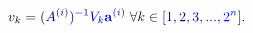 \documentclass[12pt]{article}
\begin{document}
\makeatletter
\renewcommand*{\@textcolor}[3]{%
  \protect\leavevmode
  \begingroup
    \color#1{#2}#3%
  \endgroup
}
\makeatother
\begin{displaymath}
\mathcolor[RGB]{0,0,15}{v} _ { \mathcolor[RGB]{0,0,30}{k} } \mathcolor[RGB]{0,0,45}{=} \mathcolor[RGB]{0,0,60}{(} \mathcolor[RGB]{0,0,75}{A} ^ { \mathcolor[RGB]{0,0,90}{(} \mathcolor[RGB]{0,0,105}{i} \mathcolor[RGB]{0,0,120}{)} } \mathcolor[RGB]{0,0,135}{)} ^ { \mathcolor[RGB]{0,0,150}{-} \mathcolor[RGB]{0,0,165}{1} } \mathcolor[RGB]{0,0,180}{V} _ { \mathcolor[RGB]{0,0,195}{k} } { \mathcolor[RGB]{0,0,210}{\bf} \mathcolor[RGB]{0,0,225}{a} } ^ { \mathcolor[RGB]{0,0,240}{(} \mathcolor[RGB]{0,0,255}{i} \mathcolor[RGB]{0,15,0}{)} } \mathcolor[RGB]{0,15,15}{\;} \mathcolor[RGB]{0,15,30}{\forall} \mathcolor[RGB]{0,15,45}{k} \mathcolor[RGB]{0,15,60}{\in} \mathcolor[RGB]{0,15,75}{[} \mathcolor[RGB]{0,15,90}{1} \mathcolor[RGB]{0,15,105}{,} \mathcolor[RGB]{0,15,120}{2} \mathcolor[RGB]{0,15,135}{,} \mathcolor[RGB]{0,15,150}{3} \mathcolor[RGB]{0,15,165}{,} \mathcolor[RGB]{0,15,180}{.} \mathcolor[RGB]{0,15,195}{.} \mathcolor[RGB]{0,15,210}{.} \mathcolor[RGB]{0,15,225}{,} \mathcolor[RGB]{0,15,240}{2} ^ { \mathcolor[RGB]{0,15,255}{n} } \mathcolor[RGB]{0,30,0}{]} \mathcolor[RGB]{0,30,15}{.}
\end{displaymath}
\end{document}
